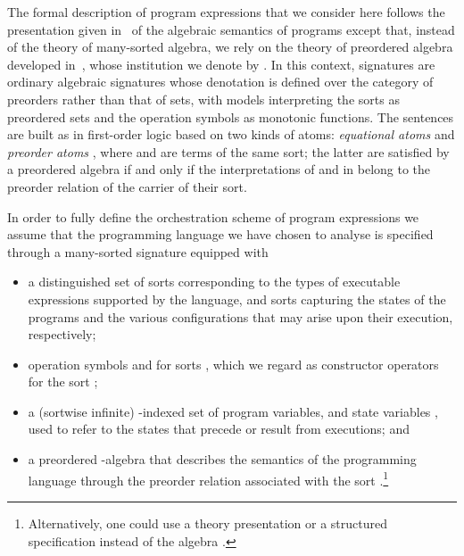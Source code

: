 \documentclass{LMCS}
\begin{document}
The formal description of program expressions that we consider here follows the presentation given in~\cite{Goguen-Malcolm:Algebraic-Semantics-of-Imperative-Programs-1996} of the algebraic semantics of programs except that, instead of the theory of many-sorted algebra, we rely on the theory of preordered algebra developed in~\cite{Diaconescu-Futatsugi:CafeOBJ-Report-1998}, whose institution we denote by .
In this context, signatures are ordinary algebraic signatures whose denotation is defined over the category of preorders rather than that of sets, with models interpreting the sorts as preordered sets and the operation symbols as monotonic functions.  The sentences are built as in first-order logic based on two kinds of atoms: \emph{equational atoms}  and \emph{preorder atoms} , where  and  are terms of the same sort; the latter are satisfied by a preordered algebra  if and only if the interpretations of  and  in  belong to the preorder relation of the carrier of their sort.

In order to fully define the orchestration scheme of program expressions we assume that the programming language we have chosen to analyse is specified through a many-sorted signature  equipped with
\begin{itemize}

\item a distinguished set of sorts  corresponding to the types of executable expressions supported by the language, and sorts  capturing the states of the programs and the various configurations that may arise upon their execution, respectively;

\item operation symbols  and  for sorts , which we regard as constructor operators for the sort ;

\item a (sortwise infinite) \nb-indexed set  of program variables, and state variables , used to refer to the states that precede or result from executions; and

\item a preordered \nb-algebra  that describes the semantics of the programming language through the preorder relation associated with the sort .\footnote{Alternatively, one could use a theory presentation or a structured specification instead of the algebra .}

\end{itemize}
\end{document}
